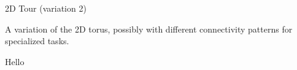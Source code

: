 \documentclass[a4paper, 10pt]{book}
\begin{document}
                    \vspace{0.3cm}
                    \noindent
                    \begin{minipage}{1\linewidth}
                        \begin{tcolorbox}[colframe=black!50, colback=white, size=small]
                            
                            {\bold 2D Tour (variation 2)}
                            
                            A variation of the 2D torus, possibly with different connectivity patterns for specialized tasks.

                            \begin{center}
                                \begin{tikzpicture}

                                    
                                    
                                \end{tikzpicture}
                            \end{center}

                        \end{tcolorbox}
                    \end{minipage}

                    Hello
\end{document}
